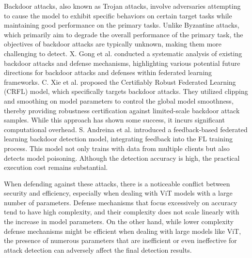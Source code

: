 \documentclass[conference]{IEEEtran}
\begin{document}
Backdoor attacks, also known as Trojan attacks, involve adversaries attempting to cause the model to exhibit specific behaviors on certain target tasks while maintaining good performance on the primary tasks\cite{canYouBackdoor}. Unlike Byzantine attacks, which primarily aim to degrade the overall performance of the primary task, the objectives of backdoor attacks are typically unknown, making them more challenging to detect. X. Gong et al. conducted a systematic analysis of existing backdoor attacks and defense mechanisms, highlighting various potential future directions for backdoor attacks and defenses within federated learning frameworks\cite{backdoorAndDefense}. C. Xie et al. proposed the Certifiably Robust Federated Learning (CRFL) model, which specifically targets backdoor attacks. They utilized clipping and smoothing on model parameters to control the global model smoothness, thereby providing robustness certification against limited-scale backdoor attack samples\cite{backdoorAndDefense_robust}. While this approach has shown some success, it incurs significant computational overhead. S. Andreina et al. introduced a feedback-based federated learning backdoor detection model, integrating feedback into the FL training process. This model not only trains with data from multiple clients but also detects model poisoning\cite{backdoorAndDefense_feedback}. Although the detection accuracy is high, the practical execution cost remains substantial.


When defending against these attacks, there is a noticeable conflict between security and efficiency, especially when dealing with ViT models with a large number of parameters. Defense mechanisms that focus excessively on accuracy tend to have high complexity, and their complexity does not scale linearly with the increase in model parameters. On the other hand, while lower complexity defense mechanisms might be efficient when dealing with large models like ViT, the presence of numerous parameters that are inefficient or even ineffective for attack detection can adversely affect the final detection results.


\end{document}
